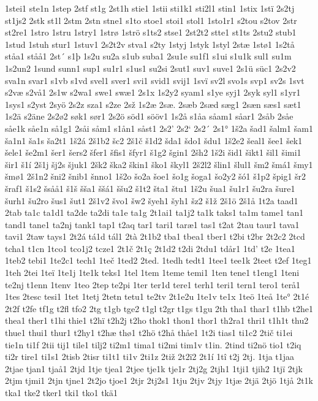 1stei1
ste1n
1step
2stf
st1g
2st1h
stie1
1stii
sti1k1
sti2l1
stin1
1stix
1stï
2s2tj
st1js2
2stk
st1l
2stm
2stn
stne1
s1to
stoe1
stoi1
stol1
1sto1r1
s2tou
s2tov
2str
st2re1
1stro
1stru
1stry1
1strø
1strö
s1ts2
stse1
2st2t2
stte1
st1ts
2stu2
stub1
1stud
1stuh
stur1
1stuv1
2s2t2v
stva1
s2ty
1styj
1styk
1styl
2stæ
1stø1
1s2tå
ståa1
ståå1
2st´
s1þ
1s2u
su2a
s1ub
suba1
2su1e
su1f1
s1ui
s1u1k
sul1
su1m
1s2un2
1sund
sunn1
sup1
su1r1
s1us1
su2si
2sut1
suv1
suve1
2s1ü
süc1
2s2v2
sva1n
svar1
s1vb
s1vd
svel1
sver1
svi1
svid1
svij1
1svï
sv2l
svo1s
svp1
sv2s
1svt
s2væ
s2vå1
2s1w
s2wa1
swe1
swæ1
2s1x
1s2y2
syam1
s1ye
syj1
2syk
syl1
s1yr1
1sys1
s2yst
2syö
2s2z
sza1
s2ze
2sž
1s2æ
2sæ.
2sæb
2sæd
sæg1
2sæn
sæs1
sæt1
1s2ä
s2äne
2s2ø2
søk1
sør1
2s2ö
söd1
sööv1
1s2å
s1åa
såam1
såar1
2såb
2såe
såe1k
såe1n
så1g1
2såi
såm1
s1ån1
såst1
2s2'
2s2`
2s2´
2s1°
1š2a
šad1
šalm1
šam1
ša1n1
ša1s
ša2t1
1š2á
2š1b2
šc2
2š1č
š1d2
šda1
šdo1
šdu1
1š2e2
šeal1
šee1
šek1
šele1
še2m1
šer1
šers2
šfer1
šfis1
šfyr1
š1g2
šgin1
2šh2
1š2i
šid1
šikt1
šil1
šimi1
šir1
š1í
2š1j
šj2s
šjuk1
2šk2
ška2
škin1
ško1
škyl1
2š2l2
šlin1
šlul1
šm2
šmá1
šmy1
šmø1
2š1n2
šni2
šnib1
šnno1
1š2o
šo2a
šoe1
šo1g
šoga1
šo2y2
šó1
š1p2
špig1
šr2
šraf1
š1s2
šsåå1
š1š
šša1
ššá1
ššu2
š1t2
šta1
štu1
1š2u
šua1
šu1r1
šu2ra
šure1
šurh1
šu2ro
šus1
šut1
2š1v2
švo1
šw2
šyeh1
šyh1
šz2
š1ž
2š1ö
2š1å
1t2a
taad1
2tab
ta1c
ta1d1
ta2de
ta2di
ta1e
ta1g
2t1ai1
ta1j2
ta1k
taks1
ta1m
tame1
tan1
tand1
tane1
ta2nj
tank1
tap1
t2aq
tar1
tari1
taræ1
tas1
t2at
2tau
taur1
tava1
tavi1
2taw
tays1
2t2á
tá1d
tál1
2tà
2t1b2
tba1
tbea1
tber1
t2bi
t2br
2t2c2
2tcd
tcha1
t1cn
1tco1
tco1j2
tcze1
2t1č
2t1ç
2t1d2
t2di
2tdu1
tdår1
1td'
t2e
1tea1
1teb2
tebi1
1te2c1
tech1
1teč
1ted2
2ted.
1tedh
tedt1
1tee1
tee1k
2teet
t2ef
1teg1
1teh
2tei
1teï
1te1j
1te1k
teks1
1tel
1tem
1teme
temi1
1ten
tene1
t1eng1
1teni
te2nj
t1enn
1tenv
1teo
2tep
te2pi
1ter
ter1d
tere1
terh1
teri1
tern1
tero1
terå1
1tes
2tesc
tesi1
1tet
1tetj
2tetn
tetu1
te2tv
2t1e2u
1te1v
te1x
1teö
1teå
1te°
2t1é
2t2f
t2fe
tf1g
t2fl
tfo2
2tg
t1gb
tge2
t1gl
t2gr
t1gs
t1gu
2th
tha1
thar1
t1hb
t2he1
thea1
ther1
t1hi
thie1
t2hï
t2h2j
t2ho
thok1
thon1
thor1
th2ra1
thri1
t1h1t
thu2
thue1
thui1
thur1
t2hy1
t2hæ
thø1
t2hö
t2hå
thåe1
1t2i
tias1
ti1c2
2tič
ti1ei
tie1n
ti1f
2tii
tij1
tile1
tilj2
ti2m1
tima1
ti2mi
tim1v
t1in.
2tind
ti2nö
tio1
t2iq
ti2r
tire1
ti1s1
2tisb
2tisr
ti1t1
ti1v
2ti1z
2tiž
2t2ï2
2t1í
1tî
t2j
2tj.
1tja
t1jaa
2tjae
tjan1
tjaå1
2tjd
1tje
tjea1
2tjee
tje1k
tje1r
2tj2g
2tjh1
1tji1
tjih2
1tjï
2tjk
2tjm
tjmi1
2tjn
tjne1
2t2jo
tjoe1
2tjr
2tj2s1
1tju
2tjv
2tjy
1tjæ
2tjä
2tjö
1tjå
2t1k
tka1
tke2
tker1
tki1
tko1
tkä1
